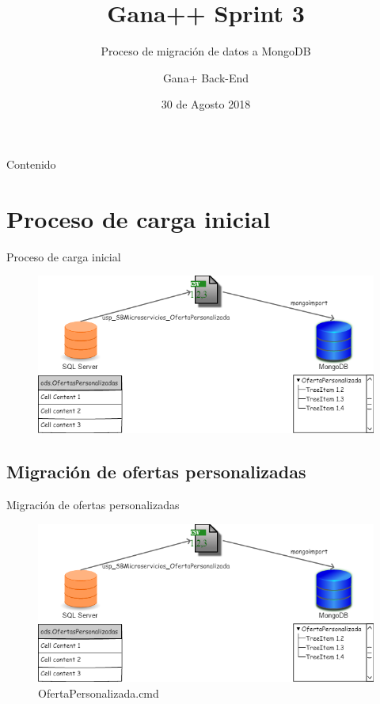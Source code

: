 \documentclass{bredelebeamer}
\title[Gana++ Sprint 3]{Gana++ Sprint 3}
\subtitle{Proceso de migración de datos a MongoDB}
\author{Gana+ Back-End}%
\institute[Hundred]
{
  Elmer Cangahuala\\
  César Cárdenas\\  
  Alexander \\
  Juan Lucero\\
  }
\date{30 de Agosto 2018}
\begin{document}
\begin{frame}
  \titlepage
\end{frame}

\begin{frame}{Contenido}
  \tableofcontents
\end{frame}

\section{Proceso de carga inicial}
\begin{frame}{Proceso de carga inicial}
\begin{figure}
\centering
\includegraphics[scale=0.35]{imgs/OfertaPersonalizada.png}
\end{figure}
\end{frame}

\subsection{Migración de ofertas personalizadas}
\begin{frame}{Migración de ofertas personalizadas}
\begin{figure}
\centering
\includegraphics[scale=0.35]{imgs/OfertaPersonalizada.png}
\caption{OfertaPersonalizada.cmd}
\end{figure}
\end{frame}
\end{document}
